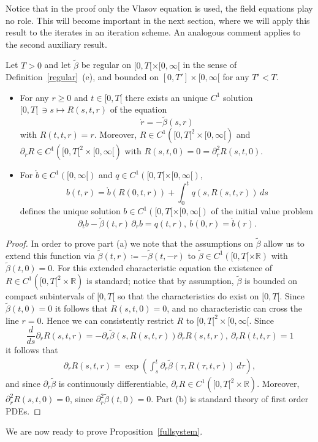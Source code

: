 \documentclass[11pt]{article}
\def\R{\mathbb R}
\begin{document}
Notice that in the proof only the Vlasov equation is used,
the field equations play no role. This will become important
in the next section, where we will apply this
result to the iterates in an iteration scheme.
An analogous comment applies to the second auxiliary result.
%
%
\begin{lemma}\label{lemmabetaeq}
  Let $T>0$ and let $\tilde \beta$ be
  regular on $[0,T[\times [0,\infty[$ in the sense of
  Definition~\ref{regular}~(e), and bounded on
  $[0,T']\times [0,\infty[$ for any $T'<T$.
  \begin{itemize}        
  \item[(a)]
    For any $r\geq 0$ and $t\in [0,T[$ there exists an unique $C^1$ solution
    $[0,T[\,\ni s\mapsto R(s,t,r)$ of the equation
    \[        
    \dot r = -\tilde \beta(s,r)
    \]
    with $R(t,t,r)=r$. Moreover, $R \in C^1([0,T[^2\times [0,\infty[)$ and
    $\partial_r R \in C^1([0,T[^2\times [0,\infty[)$ with
    $R(s,t,0) = 0 = \partial_r^2 R(s,t,0)$.
  \item[(b)]
    For $\mathring{b}\in C^1([0,\infty[)$
    and $q\in C^1([0,T[\times [0,\infty[)$,
    \[
    b(t,r) = \mathring{b}(R(0,t,r)) + \int_0^t q(s,R(s,t,r))\, ds
    \]
    defines the unique solution $b\in C^1([0,T[\times[0,\infty[)$ of
    the initial value problem
    \[        
    \partial_t b-\tilde \beta(t,r)\, \partial_r b = q(t,r),\
    b(0,r) =\mathring{b}(r).
    \]
  \end{itemize}
\end{lemma}
%
\begin{proof}
  In order to prove part (a) we note that the assumptions on $\tilde \beta$
  allow us to extend this function
  via $\tilde \beta(t,r) \coloneqq - \tilde \beta(t,-r)$ to
  $\tilde \beta\in C^1([0,T[\times \R)$ with $\tilde \beta(t,0)=0$.
  For this extended characteristic equation the existence 
  of $R\in C^1([0,T[^2\times \R)$ is standard; notice that by assumption,
  $\tilde \beta$ is bounded on compact subintervals of $[0,T[$ so that
  the characteristics do exist
  on $[0,T[$. Since $\tilde \beta(t,0)=0$ it follows that $R(s,t,0)=0$,
  and no characteristic
  can cross the line $r=0$. Hence we can consistently restrict $R$ to
  $[0,T[^2\times [0,\infty[$.        
  Since
  \[
  \frac{d}{ds} \partial_r R(s,t,r)
  = - \partial_r \tilde \beta(s,R(s,t,r)) \partial_r R(s,t,r),\
  \partial_r R(t,t,r) = 1
  \]
  it follows that
  \begin{align}\label{drRrep}
    \partial_r R(s,t,r) =
    \exp\left(\int_s^t \partial_r \tilde \beta(\tau,R(\tau,t,r))\,d\tau\right),
  \end{align}
  and since $\partial_r \tilde \beta$ is continuously
  differentiable, 
  $\partial_r R \in C^1([0,T[^2\times \R)$.
  Moreover, $\partial_r^2 R(s,t,0)=0$, since
  $\partial_r^2 \tilde \beta(t,0) =0$.  
  Part (b) is standard theory of first order PDEs.
\end{proof}
%
%
We are now ready to prove Proposition~\ref{fullsystem}.
%
\end{document}
